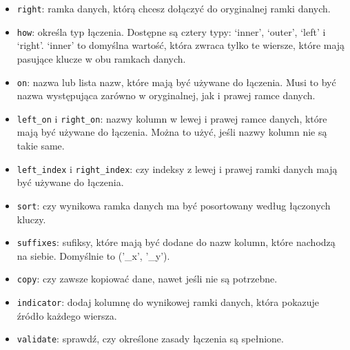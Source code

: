 \documentclass[
  polish,
  letterpaper,
  DIV=11,
  numbers=noendperiod]{scrreprt}
\providecommand{\tightlist}{%
  \setlength{\itemsep}{0pt}\setlength{\parskip}{0pt}}
\begin{document}
\begin{itemize}
\tightlist
\item
  \texttt{right}: ramka danych, którą chcesz dołączyć do oryginalnej
  ramki danych.
\item
  \texttt{how}: określa typ łączenia. Dostępne są cztery typy: `inner',
  `outer', `left' i `right'. `inner' to domyślna wartość, która zwraca
  tylko te wiersze, które mają pasujące klucze w obu ramkach danych.
\item
  \texttt{on}: nazwa lub lista nazw, które mają być używane do łączenia.
  Musi to być nazwa występująca zarówno w oryginalnej, jak i prawej
  ramce danych.
\item
  \texttt{left\_on} i \texttt{right\_on}: nazwy kolumn w lewej i prawej
  ramce danych, które mają być używane do łączenia. Można to użyć, jeśli
  nazwy kolumn nie są takie same.
\item
  \texttt{left\_index} i \texttt{right\_index}: czy indeksy z lewej i
  prawej ramki danych mają być używane do łączenia.
\item
  \texttt{sort}: czy wynikowa ramka danych ma być posortowany według
  łączonych kluczy.
\item
  \texttt{suffixes}: sufiksy, które mają być dodane do nazw kolumn,
  które nachodzą na siebie. Domyślnie to ('\_x', '\_y').
\item
  \texttt{copy}: czy zawsze kopiować dane, nawet jeśli nie są potrzebne.
\item
  \texttt{indicator}: dodaj kolumnę do wynikowej ramki danych, która
  pokazuje źródło każdego wiersza.
\item
  \texttt{validate}: sprawdź, czy określone zasady łączenia są
  spełnione.
\end{itemize}
\end{document}
